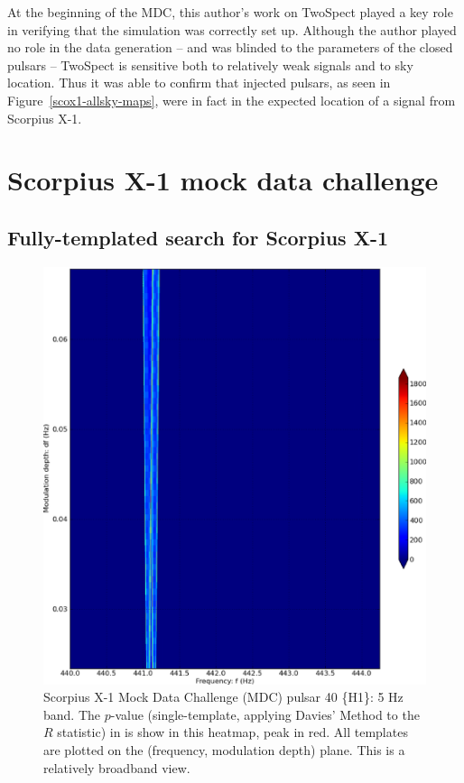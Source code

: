 At the beginning of the MDC, this author's work on TwoSpect played a key role in verifying that the simulation was correctly set up.
Although the author played no role in the data generation -- and was blinded to the parameters of the closed pulsars -- TwoSpect is sensitive both to relatively weak signals and to sky location.
Thus it was able to confirm that injected pulsars, as seen in Figure~\ref{scox1-allsky-maps}, were in fact in the expected location of a signal from Scorpius X-1.


\section{Scorpius X-1 mock data challenge}
\subsection{Fully-templated search for Scorpius X-1}


\begin{figure}
\begin{center}
\includegraphics[width=0.65\paperwidth,height=0.5\paperheight]{bandH1-bold.eps}
\caption{
Scorpius X-1 Mock Data Challenge (MDC) pulsar 40 \{H1\}: 5 Hz band. 
The $p$-value (single-template, applying Davies' Method to the $R$ statistic) in is show in this heatmap, peak in red. 
All templates are plotted on the (frequency, modulation depth) plane.
This is a relatively broadband view.
}
\label{scox1-wide-heatmap-040}
\end{center}
\end{figure}

